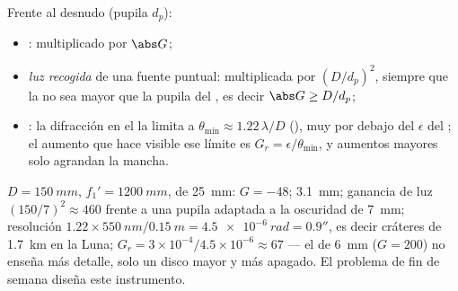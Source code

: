 \begin{proposition}\label{prop:b1:optical-instruments:gains}
Frente al  desnudo (pupila $d_p$):
\begin{itemize}
  \item \emph{}: multiplicado por $\abs G$;
  \item \emph{luz recogida} de una fuente puntual: multiplicada por
        $(D/d_p)^2$, siempre que la  no sea mayor que la
        pupila del , es decir $\abs G \geq D/d_p$;
  \item \emph{}: la difracción en el  la limita
        a $\theta_{\min} \approx 1.22\,\lambda/D$ (),
        muy por debajo del $\epsilon$ del ; el aumento que hace visible
        ese límite es $G_r = \epsilon/\theta_{\min}$, y aumentos mayores
        solo agrandan la mancha.
\end{itemize}
\end{proposition}
\admitted

\begin{example}\label{ex:b1:optical-instruments:telnum}
$D = \qty{150}{mm}$, $f_1' = \qty{1200}{mm}$,  de \qty{25}{mm}:
$G = -48$;  \qty{3.1}{mm}; ganancia de luz $(150/7)^2 \approx
460$ frente a una pupila adaptada a la oscuridad de \qty{7}{mm};
resolución $1.22 \times
\qty{550}{nm}/\qty{0.15}{m} = \qty{4.5e-6}{rad} = 0.9''$, es decir
cráteres de \qty{1.7}{km} en la Luna; $G_r = 3\times10^{-4}/4.5\times
10^{-6} \approx 67$ --- el  de \qty{6}{mm} ($G = 200$) no enseña
más detalle, solo un disco mayor y más apagado. El problema de fin de
semana diseña este instrumento.
\end{example}

